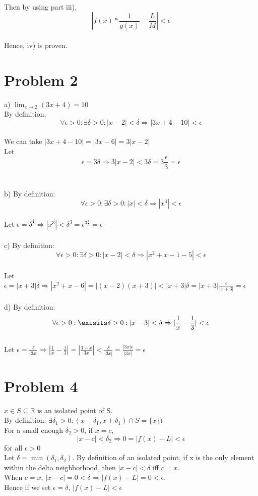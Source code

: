 \documentclass{article}
\begin{document}
\\Then by using part iii), $$|f(x) * \frac{1}{g(x)} - \frac{L}{M}| < \epsilon$$
\\Hence, iv) is proven.
\section*{Problem 2}
a) $\lim_{x \to 2} (3x+4) = 10$
\\By definition, $$\forall \epsilon > 0 : \exists \delta > 0 : |x - 2| < \delta \Rightarrow |3x + 4 - 10| < \epsilon$$
\\We can take $|3x + 4 - 10| = |3x - 6| = 3|x-2|$
\\Let $$\epsilon = 3\delta \Rightarrow 3|x -2| < 3\delta = 3\frac{\epsilon}{3} = \epsilon$$
\\
\\b) By definition: $$\forall \epsilon > 0 : \exists \delta > 0 : |x| < \delta \Rightarrow |x^3| < \epsilon$$
\\Let $\epsilon = \delta^{\frac{1}{3}} \Rightarrow |x^3| < \delta^3 = \epsilon^{3\frac{1}{3}} = \epsilon$
\\
\\c) By definition: $$\forall \epsilon > 0 : \exists \delta > 0 : |x - 2| < \delta \Rightarrow |x^2 + x - 1 - 5| < \epsilon$$
\\Let $\epsilon = |x+3|\delta \Rightarrow |x^2 + x -6| = |(x-2)(x+3)| < |x+3|\delta = |x+3|\frac{\epsilon}{|x+3|} = \epsilon$
\\
\\d) By definition: $$\forall \epsilon > 0 : \exisits \delta > 0 : |x-3| < \delta \Rightarrow |\frac{1}{x} - \frac{1}{3}| < \epsilon$$
\\Let $\epsilon = \frac{\delta}{|3x|} \Rightarrow |\frac{1}{x} - \frac{1}{3}| = |\frac{3-x}{3x}| < \frac{\delta}{|3x|} = \frac{|3x|\epsilon}{|3x|} = \epsilon$

\section*{Problem 4}
$x \in S \subseteq \mathbb{R}$ is an isolated point of S.
\\By definition: $\exists \delta_1 > 0 : (x- \delta_1, x+\delta_1) \cap S = \{x\})$
\\For a small enough $\delta_2 > 0$, if $x = c$, $$|x - c| < \delta_2 \Rightarrow 0 = |f(x) - L| < \epsilon$$ for all $\epsilon > 0$
\\Let $\delta = \min(\delta_1, \delta_2)$. By definition of an isolated point, if x is the only element within the delta neighborhood, then $|x - c| < \delta$ iff $c = x$.
\\When $c = x$, $|x - c| = 0 < \delta \Rightarrow |f(x) - L| = 0 < \epsilon$.
\\Hence if we set $\epsilon = \delta$, $|f(x) - L| < \epsilon$
\end{document}
